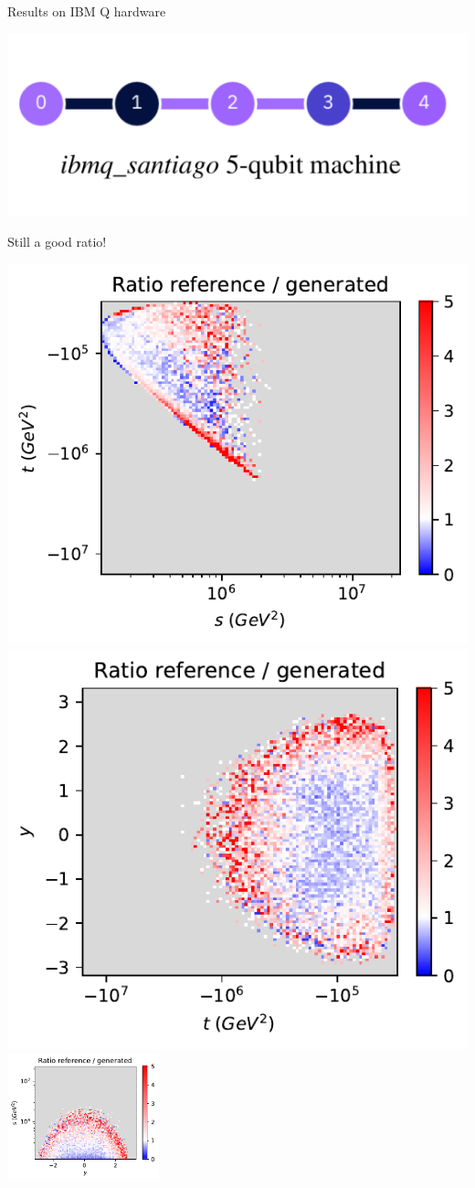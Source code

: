 \documentclass[11pt,aspectratio=169]{beamer}
\begin{document}
\begin{frame}{Results on IBM Q hardware}
    \begin{multicols*}{2}
        \includegraphics[width=0.37 \textwidth]{figures/ibm5q.png}
        \begin{tcolorbox}
            Still a good ratio!
        \end{tcolorbox}
    \end{multicols*}
    \begin{multicols*}{3}
        \includegraphics[width=0.33 \textwidth]{figures/plots/hardware/ibm_santiago/s-t_RATIO_IBM_100k.pdf}
        \includegraphics[width=0.33 \textwidth]{figures/plots/hardware/ibm_santiago/t-y_RATIO_IBM_100k.pdf}
        \includegraphics[width=0.33\textwidth]{figures/plots/hardware/ibm_santiago/y-s_RATIO_IBM_100k.pdf}
    \end{multicols*}
\end{frame}
\end{document}
